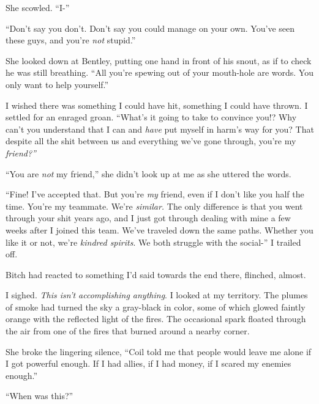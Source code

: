 She scowled.  ``I-''



``Don't say you don't.  Don't say you could manage on your own.  You've seen these guys, and you're \emph{not} stupid.''



She looked down at Bentley, putting one hand in front of his snout, as if to check he was still breathing.  ``All you're spewing out of your mouth-hole are words.  You only want to help yourself.''



I wished there was something I could have hit, something I could have thrown.  I settled for an enraged groan.  ``What's it going to take to convince you!?  Why can't you understand that I can and \emph{have} put myself in harm's way for you?  That despite all the shit between us and everything we've gone through, you're my \emph{friend?''}



``You are \emph{not} my friend,'' she didn't look up at me as she uttered the words.



``Fine!  I've accepted that.  But you're \emph{my}\emph{ }friend, even if I don't like you half the time.  You're my teammate.  We're \emph{similar.  }The only difference is that you went through your shit years ago, and I just got through dealing with mine a few weeks after I joined this team.  We've traveled down the same paths.  Whether you like it or not, we're \emph{kindred spirits}.  We both struggle with the social-''  I trailed off.



Bitch had reacted to something I'd said towards the end there, flinched, almost.



I sighed.  \emph{This isn't accomplishing anything}.  I looked at my territory.  The plumes of smoke had turned the sky a gray-black in color, some of which glowed faintly orange with the reflected light of the fires.  The occasional spark floated through the air from one of the fires that burned around a nearby corner.



She broke the lingering silence, ``Coil told me that people would leave me alone if I got powerful enough.  If I had allies, if I had money, if I scared my enemies enough.''



``When was this?''




